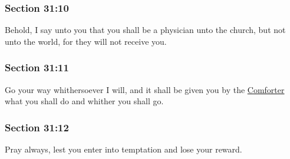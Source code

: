 	\subsubsection{Section 31:10} %
		\label{DC31-10}

		Behold, I say unto you that you shall be a physician unto the church, but not unto the world, for they will not receive you.


	\subsubsection{Section 31:11} %
		\label{DC31-11}

		Go your way whithersoever I will, and it shall be given you by the \hyperref[COMFORTER]{Comforter} what you shall do and whither you shall go.


	\subsubsection{Section 31:12} %
		\label{DC31-12}

		Pray always, lest you enter into temptation and lose your reward.


